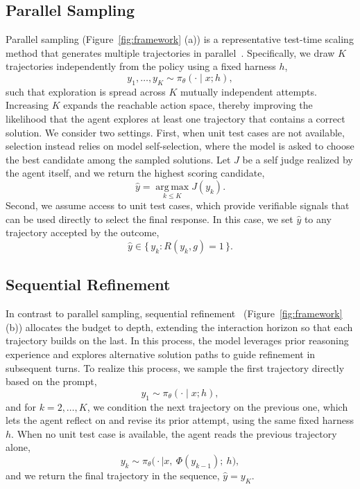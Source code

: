 \documentclass{article}
\begin{document}
\subsection{Parallel Sampling}
\label{sec:method_parallel_sampling}
Parallel sampling (Figure~\ref{fig:framework} (a)) is a representative test-time scaling method that generates multiple trajectories in parallel~\citep{wang2022self, brown2024large}. Specifically, we draw $K$ trajectories independently from the policy using a fixed harness $h$,
\[
  y_1, \dots, y_K \sim \pi_\theta(\cdot \mid x; h),
\]
such that exploration is spread across $K$ mutually independent attempts. Increasing $K$ expands the reachable action space, thereby improving the likelihood that the agent explores at least one trajectory that contains a correct solution. We consider two settings. First, when unit test cases are not available, selection instead relies on model self-selection, where the model is asked to choose the best candidate among the sampled solutions. Let $J$ be a self judge realized by the agent itself, and we return the highest scoring candidate,
\[
  \hat{y} = \operatorname*{arg\,max}_{k \le K} J(y_k).
\]
Second, we assume access to unit test cases, which provide verifiable signals that can be used directly to select the final response. In this case, we set $\hat{y}$ to any trajectory accepted by the outcome,
\[
  \hat{y} \in \{\, y_k : R(y_k, g) = 1 \,\}.
\]

\subsection{Sequential Refinement}
\label{sec:method_sequential_refinement}
In contrast to parallel sampling, sequential refinement~\citep{madaan2023self}  (Figure~\ref{fig:framework} (b)) allocates the budget to depth, extending the interaction horizon so that each trajectory builds on the last. In this process, the model leverages prior reasoning experience and explores alternative solution paths to guide refinement in subsequent turns. To realize this process, we sample the first trajectory directly based on the prompt,
\[
  y_1 \sim \pi_\theta(\cdot \mid x; h),
\]
and for $k = 2, \dots, K$, we condition the next trajectory on the previous one, which lets the agent reflect on and revise its prior attempt, using the same fixed harness $h$. When no unit test case is available, the agent reads the previous trajectory alone,
\[
  y_k \sim \pi_\theta\big(\cdot \mid x,\ \Phi(y_{k-1});\ h\big),
\]
and we return the final trajectory in the sequence, $\hat{y} = y_K$. 
\end{document}
